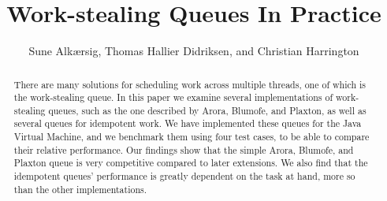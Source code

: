 \documentclass[oribibl]{llncs}
\begin{document}
\mainmatter{}
\title{Work-stealing Queues In Practice}
\author{Sune Alk\ae{}rsig, Thomas Hallier Didriksen, and Christian Harrington \\
}

\maketitle

\begin{abstract}
There are many solutions for scheduling work across multiple threads, one of which is the work-stealing queue. 
In this paper we examine several implementations of work-stealing queues, such as the one described by Arora, Blumofe, and Plaxton, as well as several queues for idempotent work.
We have implemented these queues for the Java Virtual Machine, and we benchmark them using four test cases, to be able to compare their relative performance.
Our findings show that the simple Arora, Blumofe, and Plaxton queue is very competitive compared to later extensions.
We also find that the idempotent queues' performance is greatly dependent on the task at hand, more so than the other implementations.

\end{abstract}













\appendix



\end{document}

